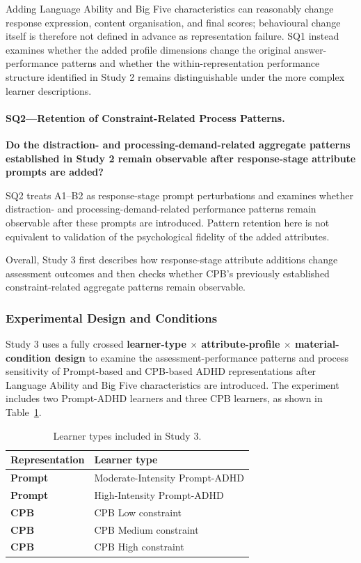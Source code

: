 Adding Language Ability and Big Five characteristics can reasonably change response expression, content organisation, and final scores; behavioural change itself is therefore not defined in advance as representation failure. SQ1 instead examines whether the added profile dimensions change the original answer-performance patterns and whether the within-representation performance structure identified in Study 2 remains distinguishable under the more complex learner descriptions.

\paragraph{SQ2---Retention of Constraint-Related Process Patterns.}

{
\textbf{Do the distraction- and processing-demand-related aggregate patterns established in Study 2 remain observable after response-stage attribute prompts are added?}
\par}

SQ2 treats A1--B2 as response-stage prompt perturbations and examines whether distraction- and processing-demand-related performance patterns remain observable after these prompts are introduced. Pattern retention here is not equivalent to validation of the psychological fidelity of the added attributes.

Overall, Study 3 first describes how response-stage attribute additions change assessment outcomes and then checks whether CPB's previously established constraint-related aggregate patterns remain observable.

\subsubsection{Experimental Design and Conditions}
\label{subsubsec:study3-conditions}

Study 3 uses a fully crossed \textbf{learner-type $\times$ attribute-profile $\times$ material-condition design} to examine the assessment-performance patterns and process sensitivity of Prompt-based and CPB-based ADHD representations after Language Ability and Big Five characteristics are introduced. The experiment includes two Prompt-ADHD learners and three CPB learners, as shown in Table~\ref{tab:study3-learner-types}.

\begin{table}[H]
\centering
\caption{Learner types included in Study 3.}
\label{tab:study3-learner-types}
\small
\begin{tabular}{p{}p{}}
\toprule
\textbf{Representation} & \textbf{Learner type} \\
\midrule
\textbf{Prompt} & Moderate-Intensity Prompt-ADHD \\
\textbf{Prompt} & High-Intensity Prompt-ADHD \\
\textbf{CPB} & CPB Low constraint \\
\textbf{CPB} & CPB Medium constraint \\
\textbf{CPB} & CPB High constraint \\
\bottomrule
\end{tabular}
\end{table}

